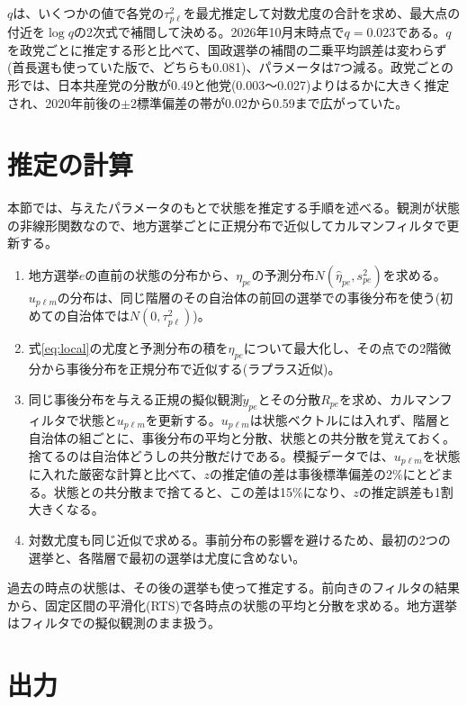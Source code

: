 \documentclass[a4paper,11pt]{ltjsarticle}
\begin{document}
$q$は、いくつかの値で各党の$\tau^2_{p\ell}$を最尤推定して対数尤度の合計を求め、最大点の付近を$\log q$の2次式で補間して決める。2026年10月末時点で$q=0.023$である。$q$を政党ごとに推定する形と比べて、国政選挙の補間の二乗平均誤差は変わらず(首長選も使っていた版で、どちらも0.081)、パラメータは7つ減る。政党ごとの形では、日本共産党の分散が0.49と他党(0.003〜0.027)よりはるかに大きく推定され、2020年前後の$\pm2$標準偏差の帯が0.02から0.59まで広がっていた。

\section{推定の計算}

本節では、与えたパラメータのもとで状態を推定する手順を述べる。観測が状態の非線形関数なので、地方選挙ごとに正規分布で近似してカルマンフィルタで更新する。

\begin{enumerate}
  \item 地方選挙$e$の直前の状態の分布から、$\eta_{pe}$の予測分布$N(\hat\eta_{pe}, s^2_{pe})$を求める。$u_{p\ell m}$の分布は、同じ階層のその自治体の前回の選挙での事後分布を使う(初めての自治体では$N(0,\tau^2_{p\ell})$)。
  \item 式\eqref{eq:local}の尤度と予測分布の積を$\eta_{pe}$について最大化し、その点での2階微分から事後分布を正規分布で近似する(ラプラス近似)。
  \item 同じ事後分布を与える正規の擬似観測$\tilde y_{pe}$とその分散$R_{pe}$を求め、カルマンフィルタで状態と$u_{p\ell m}$を更新する。$u_{p\ell m}$は状態ベクトルには入れず、階層と自治体の組ごとに、事後分布の平均と分散、状態との共分散を覚えておく。捨てるのは自治体どうしの共分散だけである。模擬データでは、$u_{p\ell m}$を状態に入れた厳密な計算と比べて、$z$の推定値の差は事後標準偏差の2\%にとどまる。状態との共分散まで捨てると、この差は15\%になり、$z$の推定誤差も1割大きくなる。
  \item 対数尤度も同じ近似で求める。事前分布の影響を避けるため、最初の2つの選挙と、各階層で最初の選挙は尤度に含めない。
\end{enumerate}

過去の時点の状態は、その後の選挙も使って推定する。前向きのフィルタの結果から、固定区間の平滑化(RTS)で各時点の状態の平均と分散を求める。地方選挙はフィルタでの擬似観測のまま扱う。

\section{出力}
\end{document}
